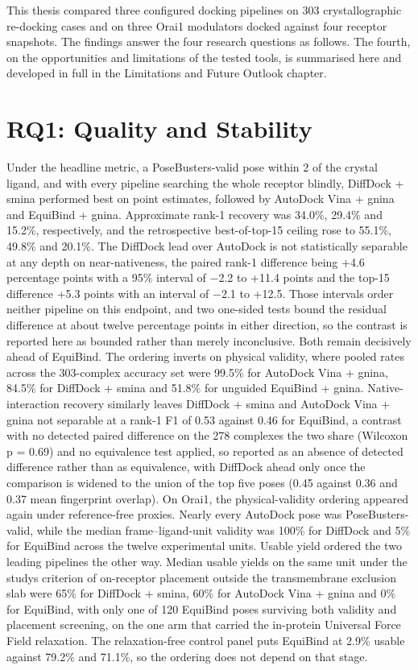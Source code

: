 This thesis compared three configured docking pipelines on 303 crystallographic re-docking cases and on three Orai1 modulators docked against four receptor snapshots. The findings answer the four research questions as follows. The fourth, on the opportunities and limitations of the tested tools, is summarised here and developed in full in the Limitations and Future Outlook chapter.

\hypertarget{rq1-quality-and-stability}{%
\section{RQ1: Quality and Stability}\label{rq1-quality-and-stability}}

Under the headline metric, a PoseBusters-valid pose within 2 \angstrom{} of the crystal ligand, and with every pipeline searching the whole receptor blindly, DiffDock + smina performed best on point estimates, followed by AutoDock Vina + gnina and EquiBind + gnina. Approximate rank-1 recovery was 34.0\%, 29.4\% and 15.2\%, respectively, and the retrospective best-of-top-15 ceiling rose to 55.1\%, 49.8\% and 20.1\%. The DiffDock lead over AutoDock is not statistically separable at any depth on near-nativeness, the paired rank-1 difference being +4.6 percentage points with a 95\% interval of \ensuremath{-}2.2 to +11.4 points and the top-15 difference +5.3 points with an interval of \ensuremath{-}2.1 to +12.5. Those intervals order neither pipeline on this endpoint, and two one-sided tests bound the residual difference at about twelve percentage points in either direction, so the contrast is reported here as bounded rather than merely inconclusive. Both remain decisively ahead of EquiBind. The ordering inverts on physical validity, where pooled rates across the 303-complex accuracy set were 99.5\% for AutoDock Vina + gnina, 84.5\% for DiffDock + smina and 51.8\% for unguided EquiBind + gnina. Native-interaction recovery similarly leaves DiffDock + smina and AutoDock Vina + gnina not separable at a rank-1 F1 of 0.53 against 0.46 for EquiBind, a contrast with no detected paired difference on the 278 complexes the two share (Wilcoxon p = 0.69) and no equivalence test applied, so reported as an absence of detected difference rather than as equivalence, with DiffDock ahead only once the comparison is widened to the union of the top five poses (0.45 against 0.36 and 0.37 mean fingerprint overlap). On Orai1, the physical-validity ordering appeared again under reference-free proxies. Nearly every AutoDock pose was PoseBusters-valid, while the median frame--ligand-unit validity was 100\% for DiffDock and 5\% for EquiBind across the twelve experimental units. Usable yield ordered the two leading pipelines the other way. Median usable yields on the same unit under the study\textquotesingle s criterion of on-receptor placement outside the transmembrane exclusion slab were 65\% for DiffDock + smina, 60\% for AutoDock Vina + gnina and 0\% for EquiBind, with only one of 120 EquiBind poses surviving both validity and placement screening, on the one arm that carried the in-protein Universal Force Field relaxation. The relaxation-free control panel puts EquiBind at 2.9\% usable against 79.2\% and 71.1\%, so the ordering does not depend on that stage.

